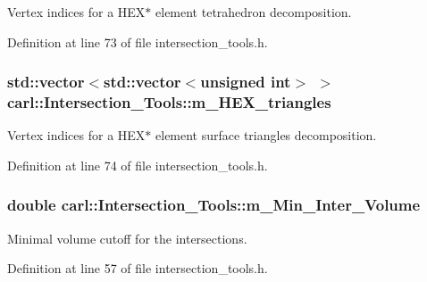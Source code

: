 Vertex indices for a H\+E\+X$\ast$ element tetrahedron decomposition. 



Definition at line 73 of file intersection\+\_\+tools.\+h.

\hypertarget{classcarl_1_1_intersection___tools_aca79d0350f0969670dd9d06814c26583}{}
\subsubsection[{m\+\_\+\+H\+E\+X\+\_\+triangles}]{\setlength{\rightskip}{0pt plus 5cm}std\+::vector$<$std\+::vector$<$unsigned int$>$ $>$ carl\+::\+Intersection\+\_\+\+Tools\+::m\+\_\+\+H\+E\+X\+\_\+triangles\hspace{0.3cm}{\ttfamily [protected]}}\label{classcarl_1_1_intersection___tools_aca79d0350f0969670dd9d06814c26583}


Vertex indices for a H\+E\+X$\ast$ element surface triangles decomposition. 



Definition at line 74 of file intersection\+\_\+tools.\+h.

\hypertarget{classcarl_1_1_intersection___tools_a931ecd3fd3103656ede9c84a2eed10d2}{}
\subsubsection[{m\+\_\+\+Min\+\_\+\+Inter\+\_\+\+Volume}]{\setlength{\rightskip}{0pt plus 5cm}double carl\+::\+Intersection\+\_\+\+Tools\+::m\+\_\+\+Min\+\_\+\+Inter\+\_\+\+Volume\hspace{0.3cm}{\ttfamily [protected]}}\label{classcarl_1_1_intersection___tools_a931ecd3fd3103656ede9c84a2eed10d2}


Minimal volume cutoff for the intersections. 



Definition at line 57 of file intersection\+\_\+tools.\+h.


